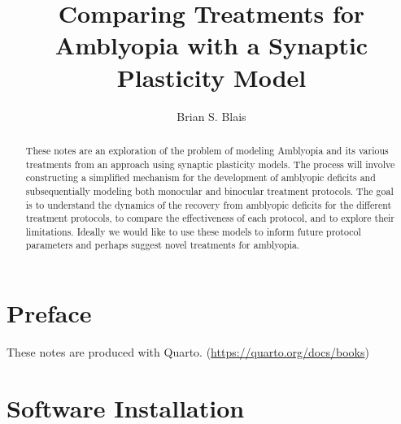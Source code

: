 \documentclass[
  letterpaper,
  number]{elsarticle}
\renewcommand*\contentsname{Table of contents}
\newcommand\contentsname{Table of contents}
\begin{document}
\begin{frontmatter}
\title{Comparing Treatments for Amblyopia with a Synaptic Plasticity
Model}
\author[]{Brian S. Blais%
%
}




        
\begin{abstract}
These notes are an exploration of the problem of modeling Amblyopia and
its various treatments from an approach using synaptic plasticity
models. The process will involve constructing a simplified mechanism for
the development of amblyopic deficits and subsequentially modeling both
monocular and binocular treatment protocols. The goal is to understand
the dynamics of the recovery from amblyopic deficits for the different
treatment protocols, to compare the effectiveness of each protocol, and
to explore their limitations. Ideally we would like to use these models
to inform future protocol parameters and perhaps suggest novel
treatments for amblyopia.
\end{abstract}





\end{frontmatter}\ifdefined\Shaded\renewenvironment{Shaded}{\begin{tcolorbox}[breakable, frame hidden, boxrule=0pt, interior hidden, enhanced, borderline west={3pt}{0pt}{shadecolor}, sharp corners]}{\end{tcolorbox}}\fi

\renewcommand*\contentsname{Table of contents}
{
\hypersetup{linkcolor=}
\setcounter{tocdepth}{2}
\tableofcontents
}

\hypertarget{preface}{%
\chapter*{Preface}\label{preface}}

These notes are produced with Quarto.
(\url{https://quarto.org/docs/books})


\hypertarget{software-installation}{%
\chapter*{Software Installation}\label{software-installation}}
\end{document}

